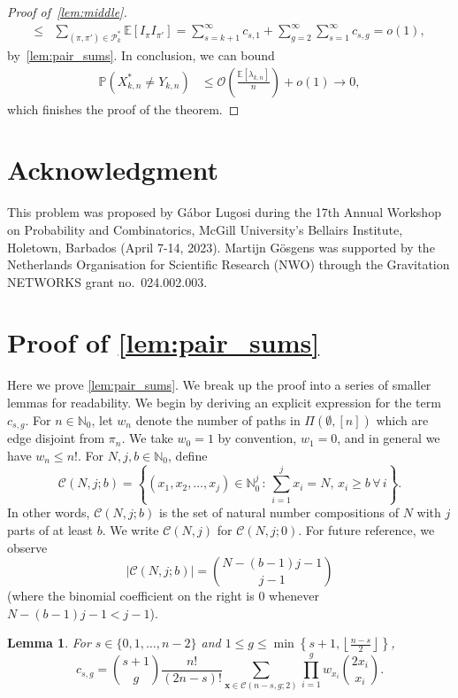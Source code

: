 \documentclass[11pt]{article}
\newtheorem{lemma}[theorem]{Lemma}
\theoremstyle{definition}
\theoremstyle{remark}
\theoremstyle{remark}
\numberwithin{theorem}{section}
\providecommand{\N}{}
\providecommand{\P}{}
\renewcommand{\N}{{\mathbb N}}
\renewcommand{\P}{\mathbb{P}}
\newcommand{\E}{\mathbb{E}}
\newcommand{\bigO}{\mathcal{O}}
\begin{document}
\begin{proof}[Proof of~\cref{lem:middle}]
\begin{align*}
        \le&\sum_{(\pi,\pi')\in\mathcal P_k^*}\E[I_\pi I_{\pi'}]
        =\sum_{s=k+1}^\infty c_{s,1}+\sum_{g=2}^\infty\sum_{s=1}^\infty c_{s,g}
        =o(1),
    \end{align*}
    by~\cref{lem:pair_sums}.
    In conclusion, we can bound
    \begin{align*}
        \P(X_{k,n}^{*}\neq Y_{k,n})
        &\le \bigO\left(\frac{\E[\lambda_{k,n}]}{n}\right)+o(1)\to0, 
    \end{align*}
    which finishes the proof of the theorem. 
\end{proof}

\section{Acknowledgment}

This problem was proposed by G{\'a}bor Lugosi during the 17th Annual Workshop on Probability and Combinatorics, McGill University’s Bellairs Institute, Holetown, Barbados (April 7-14, 2023).
Martijn Gösgens was supported by the Netherlands Organisation for Scientific Research (NWO) through the Gravitation {\sc NETWORKS} grant no.\ 024.002.003.




\appendix

\section{Proof of \cref{lem:pair_sums}}\label{sec:sm_appendix}
Here we prove \cref{lem:pair_sums}. We break up the proof into a series of smaller lemmas for readability. We begin by deriving an explicit expression for the term $c_{s,g}$. For $n \in \N_{0}$, let $w_{n}$ denote the number of paths in $\Pi(\emptyset, [n])$ which are edge disjoint from $\pi_{n}$. We take $w_{0} = 1$ by convention, $w_{1} = 0$, and in general we have $w_{n} \leq n!$. For $N, j, b \in \N_{0}$, define
$$
	\mathcal{C}(N,j;b) = \left\{(x_{1},x_{2},\dots,x_{j}) \in \N_{0}^{j}\,:\,\sum_{i=1}^{j}x_{i} = N,\,x_{i} \geq b\,\forall\,i\right\}.
$$
In other words, $\mathcal{C}(N,j;b)$ is the set of natural number compositions of $N$ with $j$ parts of at least $b$. We write $\mathcal{C}(N,j)$ for $\mathcal{C}(N,j;0)$. For future reference, we observe
$$
	|\mathcal{C}(N,j;b)| = \binom{N - (b-1)j -1}{j-1}
$$
(where the binomial coefficient on the right is $0$ whenever $N - (b-1)j -1 < j-1$). 

\begin{lemma} \label{lem:c_sg}
For $s \in \{0,1,\dots,n-2\}$ and $1 \leq g \leq \min\left\{s+1, \left\lfloor \frac{n-s}{2}\right\rfloor \right\}$,
	$$
		c_{s,g}=\binom{s+1}{g}\frac{n!}{(2n-s)!}\sum_{\bm{x} \in \mathcal{C}(n-s,g;2)}\prod_{i=1}^{g}w_{x_{i}}\binom{2x_{i}}{x_{i}}.
	$$ 
\end{lemma}
\end{document}
